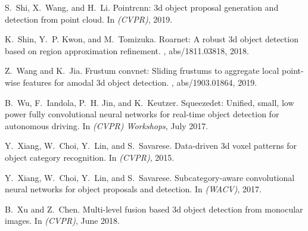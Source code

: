 \documentclass[10pt,twocolumn,letterpaper]{article}
\begin{document}
{\begin{thebibliography}{10}
S.~Shi, X.~Wang, and H.~Li.
\newblock Pointrcnn: 3d object proposal generation and detection from point
  cloud.
\newblock In {\em (CVPR)}, 2019.

K.~Shin, Y.~P. Kwon, and M.~Tomizuka.
\newblock Roarnet: {A} robust 3d object detection based on region approximation
  refinement.
, abs/1811.03818, 2018.

Z.~Wang and K.~Jia.
\newblock Frustum convnet: Sliding frustums to aggregate local point-wise
  features for amodal 3d object detection.
, abs/1903.01864, 2019.

B.~Wu, F.~Iandola, P.~H. Jin, and K.~Keutzer.
\newblock Squeezedet: Unified, small, low power fully convolutional neural
  networks for real-time object detection for autonomous driving.
\newblock In {\em (CVPR) Workshops}, July 2017.

Y.~Xiang, W.~Choi, Y.~Lin, and S.~Savarese.
\newblock Data-driven 3d voxel patterns for object category recognition.
\newblock In {\em (CVPR)}, 2015.

Y.~Xiang, W.~Choi, Y.~Lin, and S.~Savarese.
\newblock Subcategory-aware convolutional neural networks for object proposals
  and detection.
\newblock In {\em (WACV)}, 2017.

B.~Xu and Z.~Chen.
\newblock Multi-level fusion based 3d object detection from monocular images.
\newblock In {\em (CVPR)}, June 2018.

\end{thebibliography}
 }
\end{document}
